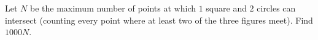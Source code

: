 Let $N$ be the maximum number of points at which $1$ square and $2$ circles can intersect (counting every point where at least two of the three figures meet). Find $1000N$.
